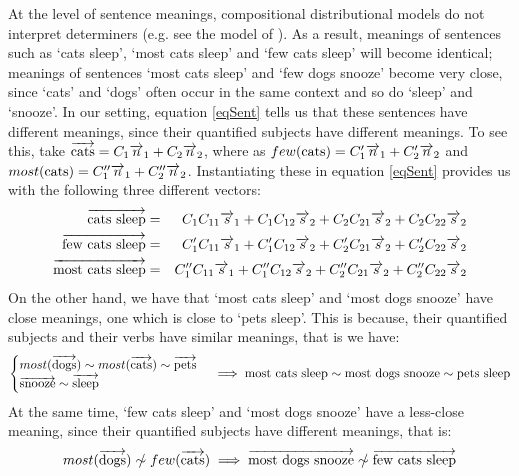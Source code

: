 \documentclass[a4paper,11pt]{easychair}
\begin{document}
At the level of sentence meanings,  compositional  distributional models  do not interpret determiners (e.g. see  the model of \cite{ML}). As a result, meanings of sentences such as `cats sleep', `most cats sleep' and `few cats sleep'  will become identical; meanings of sentences `most cats sleep' and `few dogs snooze' become very close, since `cats' and `dogs' often occur in the same context and so do `sleep' and `snooze'. In our setting, equation \ref{eqSent} tells us that these sentences have different meanings, since their quantified subjects have different meanings. To see this, take  $\overrightarrow{\text{cats}} = C_1 \overrightarrow{n}_1 + C_2 \overrightarrow{n}_2$, where as $few(\text{cats}) = C'_1 \overrightarrow{n}_1 + C'_2 \overrightarrow{n}_2$ and $most(\text{cats}) = C''_1 \overrightarrow{n}_1 + C''_2 \overrightarrow{n}_2$. Instantiating these in equation \ref{eqSent} provides us with the following three different vectors:
\begin{eqnarray*}
\overrightarrow{\mbox{cats sleep}} &=&C_1 C_{11} \overrightarrow{s}_1 + C_1 C_{12} \overrightarrow{s}_2 + C_2 C_{21} \overrightarrow{s}_2 + C_2 C_{22} \overrightarrow{s}_2\\
\overrightarrow{\mbox{few cats sleep}} &=&C'_1 C_{11} \overrightarrow{s}_1 + C'_1 C_{12} \overrightarrow{s}_2 + C'_2 C_{21} \overrightarrow{s}_2 + C'_2 C_{22} \overrightarrow{s}_2\\
\overrightarrow{\mbox{most cats sleep}} &=& C''_1 C_{11} \overrightarrow{s}_1 + C''_1 C_{12} \overrightarrow{s}_2 + C''_2 C_{21} \overrightarrow{s}_2 + C''_2 C_{22} \overrightarrow{s}_2
\end{eqnarray*}
On the other hand, we have  that `most cats sleep' and `most dogs snooze'  have close meanings, one which is close to `pets sleep'.  This is because, their quantified   subjects and their  verbs have similar meanings, that is we have:
\[
\begin{cases}
most(\overrightarrow{\text{dogs}}) \sim most(\overrightarrow{\text{cats}}) \sim  \overrightarrow{\text{pets}}&\\
\overrightarrow{\text{snooze}}  \sim \overrightarrow{\text{sleep}} &
\end{cases} \implies 
\mbox{most cats sleep}  \sim  \mbox{most dogs snooze} \sim
\mbox{pets sleep}
\]
At the same time,  `few cats sleep' and `most dogs snooze' have a less-close meaning, since their quantified  subjects have different meanings, that is:
\[
most(\ov{\text{dogs}}) \sim\!\!\!\!\!/ \ few(\ov{\text{cats}})  \implies \ov{\mbox{most dogs snooze}}  \sim\!\!\!\!\!/ \
\ov{\mbox{few cats sleep}}
\]





%
\end{document}
